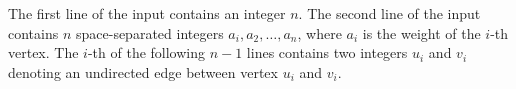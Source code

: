 The first line of the input contains an integer $n$.
The second line of the input contains $n$ space-separated integers $a_i,a_2,\ldots,a_n$, where $a_i$ is the weight of the $i$-th vertex.
The $i$-th of the following $n - 1$ lines contains two integers $u_i$ and $v_i$ denoting an undirected edge between vertex $u_i$ and $v_i$.